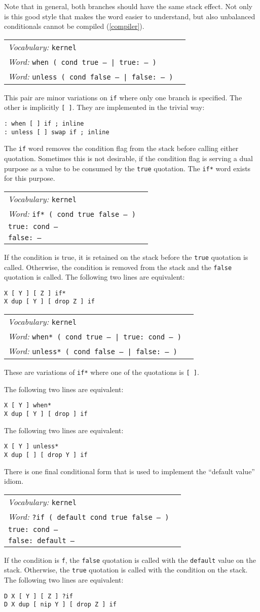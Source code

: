 \documentclass{book}
\newcommand{\vocabulary}[1]{\emph{Vocabulary:} \texttt{#1}&\\}
\newcommand{\ordinaryword}[2]{\index{\texttt{#1}}\emph{Word:} \texttt{#2}&\\}
\newcommand{\wordtable}[1]{


\begin{tabularx}{12cm}{lX}
\hline
#1
\hline
\end{tabularx}

}
\begin{document}
Note that in general, both branches should have the same stack effect. Not only is this good style that makes the word easier to understand, but also unbalanced conditionals cannot be compiled (\ref{compiler}).
\wordtable{
\vocabulary{kernel}
\ordinaryword{when}{when ( cond true -- | true:~-- )}
\ordinaryword{unless}{unless ( cond false -- | false:~-- )}
}
This pair are minor variations on \texttt{if} where only one branch is specified. The other is implicitly \texttt{[ ]}. They are implemented in the trivial way:
\begin{verbatim}
: when [ ] if ; inline
: unless [ ] swap if ; inline
\end{verbatim}
The \texttt{if} word removes the condition flag from the stack before calling either quotation. Sometimes this is not desirable, if the condition flag is serving a dual purpose as a value to be consumed by the \texttt{true} quotation. The \texttt{if*} word exists for this purpose.
\wordtable{
\vocabulary{kernel}
\ordinaryword{if*}{if*~( cond true false -- )}
\texttt{true:~cond --}\\
\texttt{false:~--}\\
}
If the condition is true, it is retained on the stack before the \texttt{true} quotation is called. Otherwise, the condition is removed from the stack and the \texttt{false} quotation is called. The following two lines are equivalent:
\begin{verbatim}
X [ Y ] [ Z ] if*
X dup [ Y ] [ drop Z ] if
\end{verbatim}
\wordtable{
\vocabulary{kernel}
\ordinaryword{when*}{when*~( cond true -- | true:~cond -- )}
\ordinaryword{unless*}{unless*~( cond false -- | false:~-- )}
}
These are variations of \texttt{if*} where one of the quotations is \texttt{[ ]}.

The following two lines are equivalent:
\begin{verbatim}
X [ Y ] when*
X dup [ Y ] [ drop ] if
\end{verbatim}
The following two lines are equivalent:
\begin{verbatim}
X [ Y ] unless*
X dup [ ] [ drop Y ] if
\end{verbatim}

There is one final conditional form that is used to implement the ``default value'' idiom.
\wordtable{
\vocabulary{kernel}
\ordinaryword{?if}{?if ( default cond true false -- )}
\texttt{true:~cond --}\\
\texttt{false:~default --}\\
}
If the condition is \texttt{f}, the \texttt{false} quotation is called with the \texttt{default} value on the stack. Otherwise, the \texttt{true} quotation is called with the condition on the stack. The following two lines are equivalent:
\begin{verbatim}
D X [ Y ] [ Z ] ?if
D X dup [ nip Y ] [ drop Z ] if
\end{verbatim}
\end{document}
